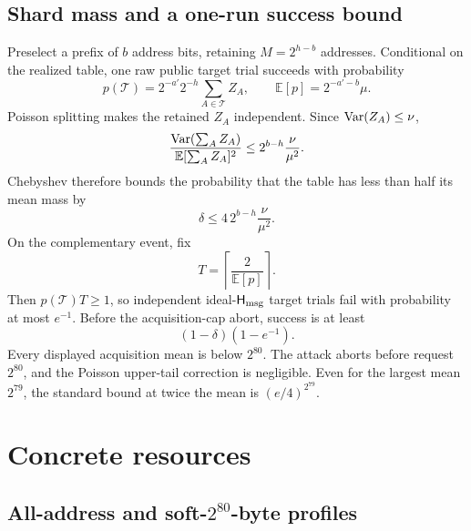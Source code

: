 \documentclass[11pt,a4paper]{article}
\newcommand{\Hmsg}{\ensuremath{\mathsf{H}_{\rm msg}}}
\newcommand{\E}{\mathbb E}
\newcommand{\Var}{\mathop{\rm Var}}
\begin{document}
\subsection{Shard mass and a one-run success bound}

Preselect a prefix of $b$ address bits, retaining
$M=2^{h-b}$ addresses.  Conditional on the realized table, one raw public
target trial succeeds with probability
\begin{equation}
 p(\mathcal T)=2^{-a'}2^{-h}\sum_{A\in\mathcal T}Z_A,
 \qquad \E[p]=2^{-a'-b}\mu.                             \label{eq:trial}
\end{equation}
Poisson splitting makes the retained $Z_A$ independent.  Since
$\Var(Z_A)\leq\nu$,
\begin{equation}
 \frac{\Var(\sum_A Z_A)}{\E[\sum_A Z_A]^2}
 \leq 2^{b-h}\frac{\nu}{\mu^2}.                        \label{eq:relvar}
\end{equation}
Chebyshev therefore bounds the probability that the table has less than half
its mean mass by
\begin{equation}
 \delta\leq4\,2^{b-h}\frac{\nu}{\mu^2}.                \label{eq:cheb}
\end{equation}
On the complementary event, fix
\begin{equation}
 T=\left\lceil\frac{2}{\E[p]}\right\rceil .             \label{eq:T}
\end{equation}
Then $p(\mathcal T)T\geq1$, so independent ideal-$\Hmsg$ target trials fail
with probability at most $e^{-1}$.  Before the acquisition-cap abort, success
is at least
\begin{equation}
                     (1-\delta)(1-e^{-1}).              \label{eq:success}
\end{equation}
Every displayed acquisition mean is below $2^{80}$.  The attack aborts before
request $2^{80}$, and the Poisson upper-tail correction is negligible.  Even
for the largest mean $2^{79}$, the standard bound at twice the mean is
$(e/4)^{2^{79}}$.

\section{Concrete resources}

\subsection{All-address and \texorpdfstring{soft-$2^{80}$-byte}{soft-2-to-80-byte} profiles}
\end{document}
